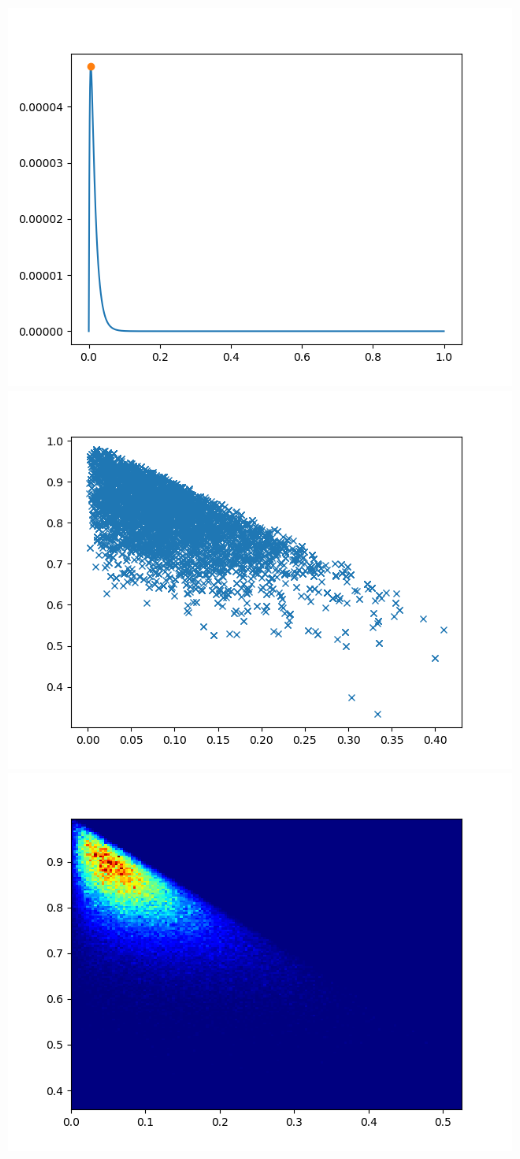 \documentclass[pt12]{article}
\begin{document}
\newpage

\begin{center}
\includegraphics[scale=0.5]{hip17.png}\\
\includegraphics[scale=0.5]{sc17.png}\\
\includegraphics[scale=0.5]{den17.png}\\
\end{center}
\end{document}
